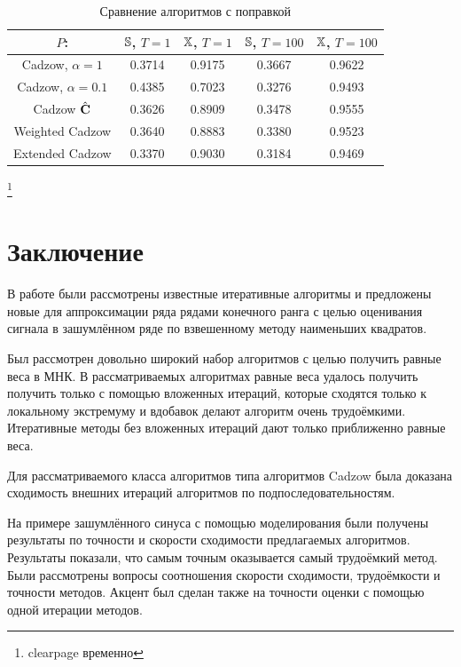 \documentclass[12pt,a4paper,fleqn,leqno]{article}
\begin{document}
\begin{table}[!hhh]
	\begin{center}
		\caption{Сравнение алгоритмов с поправкой}\label{fintable_improved}
		\begin{tabular}{|c|c|c|c|c|}
			\hline
			$P$: & $\mathbb{S}$, $T = 1$ & $\mathbb{X}$, $T = 1$ & $\mathbb{S}$, $T = 100$ & $\mathbb{X}$, $T = 100$  \\
			\hline
			Cadzow, $\alpha = 1$ & 0.3714 & 0.9175 & 0.3667 & 0.9622 \\
			\hline
			Cadzow, $\alpha = 0.1$ & 0.4385 & 0.7023 & 0.3276 & 0.9493 \\
			\hline
			Cadzow $\hat{\mathbf{C}}$ & 0.3626 & 0.8909 & 0.3478 & 0.9555 \\
			\hline
			Weighted Cadzow & 0.3640 & 0.8883 & 0.3380 & 0.9523 \\
			\hline
			Extended Cadzow & 0.3370 & 0.9030 & 0.3184 & 0.9469 \\
			\hline
		\end{tabular}
	\end{center}
\end{table}


\clearpage
\footnote{clearpage временно}
\section{Заключение}
\label{sec:concl}
В работе были рассмотрены известные итеративные алгоритмы и предложены новые для аппроксимации ряда рядами конечного ранга с целью
оценивания сигнала в зашумлённом ряде по взвешенному методу наименьших квадратов.


Был рассмотрен довольно широкий набор алгоритмов с целью получить равные веса в МНК. В рассматриваемых алгоритмах равные веса удалось получить 
получить только с помощью вложенных итераций, которые сходятся только к локальному экстремуму и вдобавок делают алгоритм очень трудоёмкими.
Итеративные методы без вложенных итераций дают только приближенно равные веса.

Для рассматриваемого класса алгоритмов типа алгоритмов Cadzow была доказана сходимость внешних итераций алгоритмов по подпоследовательностям.

На примере зашумлённого синуса с помощью моделирования были получены результаты по точности и скорости сходимости предлагаемых алгоритмов.
Результаты показали, что самым точным оказывается самый трудоёмкий метод. 
Были рассмотрены вопросы соотношения скорости сходимости, трудоёмкости и точности методов.
Акцент был сделан также на точности оценки с помощью одной итерации методов.
\end{document}
